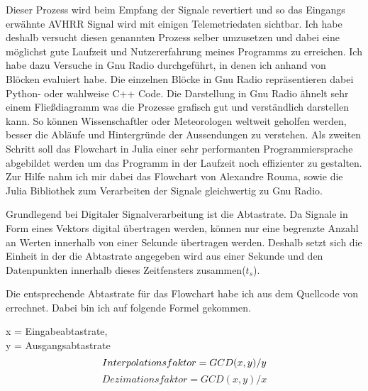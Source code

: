 \begin{multicols*}{2}
    \cite{APT-How_it_works}
    Dieser Prozess wird beim Empfang der Signale revertiert und so das Eingangs erwähnte AVHRR Signal wird mit einigen Telemetriedaten sichtbar. Ich habe deshalb versucht diesen genannten Prozess selber umzusetzen und dabei eine möglichst gute Laufzeit und Nutzererfahrung meines Programms zu erreichen. Ich habe dazu Versuche in Gnu Radio durchgeführt, in denen ich anhand von Blöcken evaluiert habe. Die einzelnen Blöcke in Gnu Radio repräsentieren dabei Python- oder wahlweise C++ Code. Die Darstellung in Gnu Radio ähnelt sehr einem Fließdiagramm was die Prozesse grafisch gut und verständlich darstellen kann. So können Wissenschaftler oder Meteorologen weltweit geholfen werden, besser die Abläufe und Hintergründe der Aussendungen zu verstehen. Als zweiten Schritt soll das Flowchart in Julia einer sehr performanten Programmiersprache abgebildet werden um das Programm in der Laufzeit noch effizienter zu gestalten. Zur Hilfe nahm ich mir dabei das Flowchart von Alexandre Rouma\cite{AlexandreRouma}, sowie die Julia Bibliothek \cite[]{DSP.jl} zum Verarbeiten der Signale gleichwertig zu Gnu Radio. 

    Grundlegend bei Digitaler Signalverarbeitung ist die Abtastrate. Da Signale in Form eines Vektors digital übertragen werden, können nur eine begrenzte Anzahl an Werten innerhalb von einer Sekunde übertragen werden. Deshalb setzt sich die Einheit in der die Abtastrate angegeben wird aus einer Sekunde und den Datenpunkten innerhalb dieses Zeitfensters zusammen(\( t_s \)).
    
    Die entsprechende Abtastrate für das Flowchart habe ich aus dem Quellcode von \cite{APT-How_it_works} errechnet. Dabei bin ich auf folgende Formel gekommen.
    
    x = Eingabeabtastrate,\\ y = Ausgangsabtastrate
    \begin{equation}
        Interpolationsfaktor = GCD(x,y) / y \\
    \end{equation}
    \begin{equation}
        Dezimationsfaktor = GCD(x,y) / x 
    \end{equation}


\end{multicols*}

